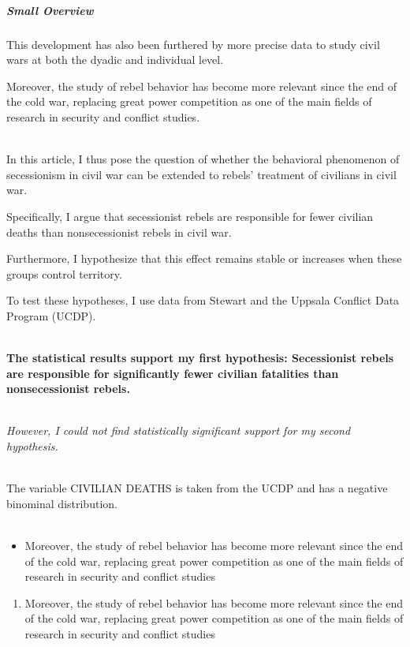 \documentclass[12pt]{article} %
\begin{document}
\subparagraph{Small Overview} 

This development has also been furthered by more precise data to study civil wars at both the dyadic and individual level. 

\pagebreak

Moreover, the study of rebel behavior has become more relevant since the end of the cold war, replacing great power competition as one of the main fields of research in security and conflict studies. \\ \

In this article, I thus pose the question of whether the behavioral phenomenon of secessionism in civil war can be extended to rebels' treatment of civilians in civil war. \bigskip 

Specifically, I argue that secessionist rebels are responsible for fewer civilian deaths than nonsecessionist rebels in civil war. \medskip 

Furthermore, I hypothesize that this effect remains stable or increases when these groups control territory. \smallskip 

To test these hypotheses, I use data from Stewart and the Uppsala Conflict Data Program (UCDP). \\ \

\textbf{The statistical results support my first hypothesis: Secessionist rebels are responsible for significantly fewer civilian fatalities than nonsecessionist rebels.} \\ \
	
\textit{However, I could not find statistically significant support for my second hypothesis.} \\ \

The variable {\footnotesize{CIVILIAN DEATHS}} is taken from the UCDP and has a negative binominal distribution. \\ \

\begin{itemize}
	\item Moreover, the study of rebel behavior has become more relevant since the end of the cold war, replacing great power competition as one of the main fields of research in security and conflict studies
\end{itemize}

\bigskip

\begin{enumerate}
	\item Moreover, the study of rebel behavior has become more relevant since the end of the cold war, replacing great power competition as one of the main fields of research in security and conflict studies
\end{enumerate}
\end{document}
